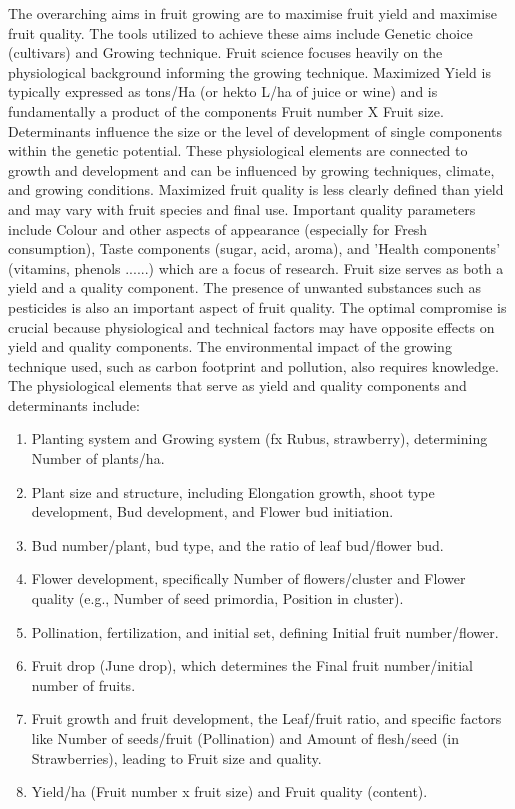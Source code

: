 \vspace{1em}
The overarching aims in fruit growing are to maximise fruit yield and maximise fruit quality. The tools utilized to achieve these aims include Genetic choice (cultivars) and Growing technique. Fruit science focuses heavily on the physiological background informing the growing technique. Maximized Yield is typically expressed as tons/Ha (or hekto L/ha of juice or wine) and is fundamentally a product of the components Fruit number X Fruit size. Determinants influence the size or the level of development of single components within the genetic potential. These physiological elements are connected to growth and development and can be influenced by growing techniques, climate, and growing conditions.
Maximized fruit quality is less clearly defined than yield and may vary with fruit species and final use. Important quality parameters include Colour and other aspects of appearance (especially for Fresh consumption), Taste components (sugar, acid, aroma), and 'Health components' (vitamins, phenols ......) which are a focus of research. Fruit size serves as both a yield and a quality component. The presence of unwanted substances such as pesticides is also an important aspect of fruit quality. The optimal compromise is crucial because physiological and technical factors may have opposite effects on yield and quality components. The environmental impact of the growing technique used, such as carbon footprint and pollution, also requires knowledge.
The physiological elements that serve as yield and quality components and determinants include: 

\begin{enumerate} 
    \item Planting system and Growing system (fx Rubus, strawberry), determining Number of plants/ha. 
    \item Plant size and structure, including Elongation growth, shoot type development, Bud development, and Flower bud initiation. 
    \item Bud number/plant, bud type, and the ratio of leaf bud/flower bud. 
    \item Flower development, specifically Number of flowers/cluster and Flower quality (e.g., Number of seed primordia, Position in cluster). 
    \item Pollination, fertilization, and initial set, defining Initial fruit number/flower. 
    \item Fruit drop (June drop), which determines the Final fruit number/initial number of fruits. 
    \item Fruit growth and fruit development, the Leaf/fruit ratio, and specific factors like Number of seeds/fruit (Pollination) and Amount of flesh/seed (in Strawberries), leading to Fruit size and quality. 
    \item Yield/ha (Fruit number x fruit size) and Fruit quality (content). 
\end{enumerate}

